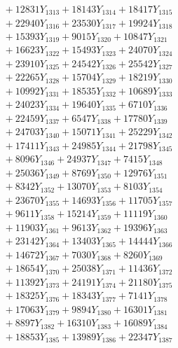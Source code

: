 \documentclass[a4paper,10pt]{article}
\begin{document}
{\begin{align}
&\;  + 12831 Y_{1313} + 18143 Y_{1314} + 18417 Y_{1315} \\[0.3ex]
&\;  + 22940 Y_{1316} + 23530 Y_{1317} + 19924 Y_{1318} \\[0.5ex]\allowbreak
&\;  + 15393 Y_{1319} + 9015 Y_{1320} + 10847 Y_{1321} \\[0.3ex]
&\;  + 16623 Y_{1322} + 15493 Y_{1323} + 24070 Y_{1324} \\[0.3ex]
&\;  + 23910 Y_{1325} + 24542 Y_{1326} + 25542 Y_{1327} \\[0.3ex]
&\;  + 22265 Y_{1328} + 15704 Y_{1329} + 18219 Y_{1330} \\[0.3ex]
&\;  + 10992 Y_{1331} + 18535 Y_{1332} + 10689 Y_{1333} \\[0.3ex]
&\;  + 24023 Y_{1334} + 19640 Y_{1335} + 6710 Y_{1336} \\[0.3ex]
&\;  + 22459 Y_{1337} + 6547 Y_{1338} + 17780 Y_{1339} \\[0.3ex]
&\;  + 24703 Y_{1340} + 15071 Y_{1341} + 25229 Y_{1342} \\[0.3ex]
&\;  + 17411 Y_{1343} + 24985 Y_{1344} + 21798 Y_{1345} \\[0.3ex]
&\;  + 8096 Y_{1346} + 24937 Y_{1347} + 7415 Y_{1348} \\[0.5ex]\allowbreak
&\;  + 25036 Y_{1349} + 8769 Y_{1350} + 12976 Y_{1351} \\[0.3ex]
&\;  + 8342 Y_{1352} + 13070 Y_{1353} + 8103 Y_{1354} \\[0.3ex]
&\;  + 23670 Y_{1355} + 14693 Y_{1356} + 11705 Y_{1357} \\[0.3ex]
&\;  + 9611 Y_{1358} + 15214 Y_{1359} + 11119 Y_{1360} \\[0.3ex]
&\;  + 11903 Y_{1361} + 9613 Y_{1362} + 19396 Y_{1363} \\[0.3ex]
&\;  + 23142 Y_{1364} + 13403 Y_{1365} + 14444 Y_{1366} \\[0.3ex]
&\;  + 14672 Y_{1367} + 7030 Y_{1368} + 8260 Y_{1369} \\[0.3ex]
&\;  + 18654 Y_{1370} + 25038 Y_{1371} + 11436 Y_{1372} \\[0.3ex]
&\;  + 11392 Y_{1373} + 24191 Y_{1374} + 21180 Y_{1375} \\[0.3ex]
&\;  + 18325 Y_{1376} + 18343 Y_{1377} + 7141 Y_{1378} \\[0.5ex]\allowbreak
&\;  + 17063 Y_{1379} + 9894 Y_{1380} + 16301 Y_{1381} \\[0.3ex]
&\;  + 8897 Y_{1382} + 16310 Y_{1383} + 16089 Y_{1384} \\[0.3ex]
&\;  + 18853 Y_{1385} + 13989 Y_{1386} + 22347 Y_{1387} \\[0.3ex]

\end{align}}
\end{document}
